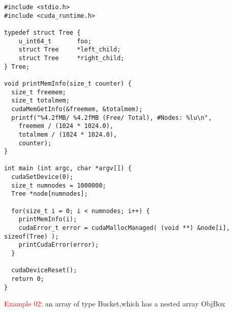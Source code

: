 \begin{lstlisting}
#include <stdio.h>
#include <cuda_runtime.h>

typedef struct Tree {
    u_int64_t       foo;
    struct Tree     *left_child;
    struct Tree     *right_child;
} Tree;

void printMemInfo(size_t counter) {
  size_t freemem;
  size_t totalmem;
  cudaMemGetInfo(&freemem, &totalmem);
  printf("%4.2fMB/ %4.2fMB (Free/ Total), #Nodes: %lu\n",
    freemem / (1024 * 1024.0),
    totalmem / (1024 * 1024.0),
    counter);
}

int main (int argc, char *argv[]) {
  cudaSetDevice(0);
  size_t numnodes = 1000000;
  Tree *node[numnodes];

  for(size_t i = 0; i < numnodes; i++) {
    printMemInfo(i);
    cudaError_t error = cudaMallocManaged( (void **) &node[i], sizeof(Tree) );
    printCudaError(error);
  }

  cudaDeviceReset();
  return 0;
}
\end{lstlisting}

\textcolor{red}{Example 02}:
an array of type Bucket,which has a nested array ObjBox

